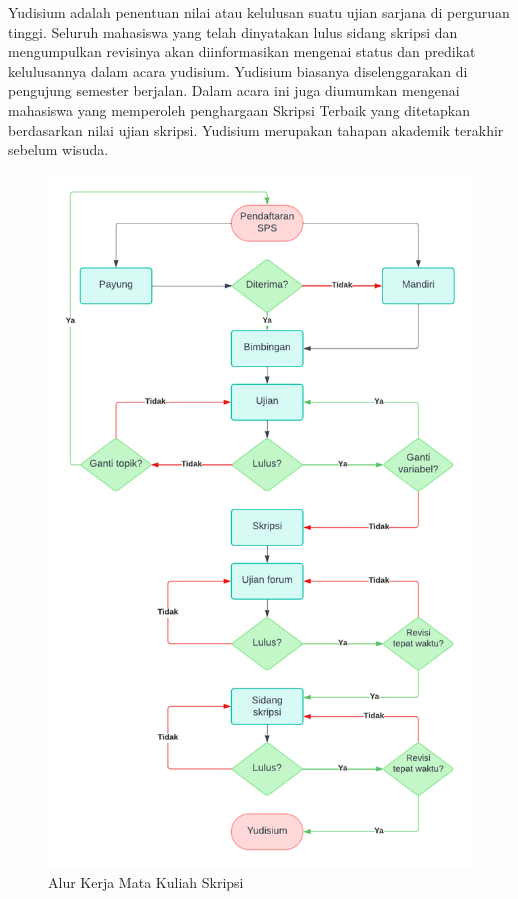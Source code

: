 \documentclass[
  indonesian,
  letterpaper,
]{scrbook}
\begin{document}
Yudisium adalah penentuan nilai atau kelulusan suatu ujian sarjana di
perguruan tinggi. Seluruh mahasiswa yang telah dinyatakan lulus sidang
skripsi dan mengumpulkan revisinya akan diinformasikan mengenai status
dan predikat kelulusannya dalam acara yudisium. Yudisium biasanya
diselenggarakan di pengujung semester berjalan. Dalam acara ini juga
diumumkan mengenai mahasiswa yang memperoleh penghargaan Skripsi Terbaik
yang ditetapkan berdasarkan nilai ujian skripsi. Yudisium merupakan
tahapan akademik terakhir sebelum wisuda.

\begin{figure}[H]

{\centering \includegraphics[width=4.6875in,height=\textheight,keepaspectratio]{images/1_1_alurskripsi.png}

}

\caption{Alur Kerja Mata Kuliah Skripsi}

\end{figure}%
\end{document}
